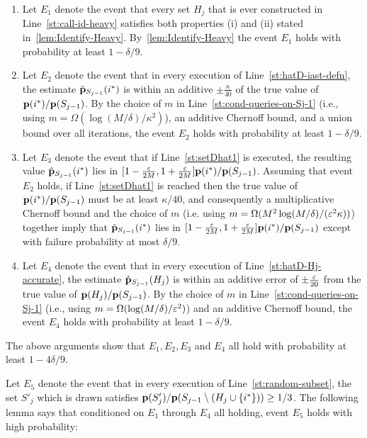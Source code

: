 \begin{enumerate}

\item Let $E_1$ denote the event that every set $H_{j}$ that is
ever constructed in Line~\ref{st:call-id-heavy}
satisfies both properties (i) and (ii)
stated in~\cref{lem:Identify-Heavy}.  By~\cref{lem:Identify-Heavy}
the event $E_1$ holds with probability at least $1 - \delta/9$.

\item Let $E_2$ denote the event that in every execution of
Line~\ref{st:hatD-iast-defn}, the estimate $\hat{\mathbf{p}}_{S_{j-1}}(i^\ast)$
is within an additive $\pm {\frac \kappa {40}}$ of the true value of
$\mathbf{p}(i^\ast)/\mathbf{p}(S_{j-1})$.  By the choice of $m$ in
Line~\ref{st:cond-queries-on-Sj-1}
{(i.e., using $m =\Omega(\log(M/\delta)/\kappa^2)$)},
an additive Chernoff bound, {and a union bound over all iterations},
the event $E_2$ holds with probability at least $1 - \delta/9$.

\item Let $E_3$ denote the event that if Line~\ref{st:setDhat1} is executed,
the resulting value
$\hat{\mathbf{p}}_{S_{j-1}}(i^\ast)$ lies in \mbox{$[1 - {\frac{\varepsilon}{2M}},
1+{\frac{\varepsilon}{2M}}]\mathbf{p}(i^\ast)/\mathbf{p}(S_{j-1})$.} Assuming that event $E_2$ holds, if Line~\ref{st:setDhat1} is reached then
the true value of $\mathbf{p}(i^\ast)/\mathbf{p}(S_{j-1})$ must be at least $\kappa/40$,
and consequently
a multiplicative Chernoff bound and the choice of $m$
{(i.e. using $m = \Omega(M^2\log(M/\delta)/(\varepsilon^2\kappa))$)}
together imply that
$\hat{\mathbf{p}}_{S_{j-1}}(i^\ast)$ lies in $[1 - {\frac{\varepsilon}{2M}},
1+{\frac{\varepsilon}{2M}}]\mathbf{p}(i^\ast)/\mathbf{p}(S_{j-1})$
except with failure probability at most $\delta/9$.

\item Let $E_4$ denote the event that
in every execution of
Line~\ref{st:hatD-Hj-accurate}, the estimate $\hat{\mathbf{p}}_{S_{j-1}}(H_{j})$
is within an additive error of $\pm {\frac{\ensuremath{\varepsilon}}{20} }$ from the true value of
$\mathbf{p}(H_{j})/\mathbf{p}(S_{j-1})$.  By the choice of $m$ in
Line~\ref{st:cond-queries-on-Sj-1}
{(i.e., using  $m = \Omega(\log(M/\delta)/\varepsilon^2)$)}
and an additive Chernoff bound,
the event $E_4$ holds with probability at least $1 - \delta/9$.

\end{enumerate}

The above arguments show that $E_1,E_2,E_3$ and $E_4$ all hold with probability
at least $1 - 4\delta/9$.

Let $E_5$ denote the event that in every execution of
Line~\ref{st:random-subset}, the set $S'_j$ which is drawn satisfies
\mbox{$\mathbf{p}(S'_j)/\mathbf{p}(S_{j-1} \setminus (H_{j} \cup \{i^\ast\})) \geq 1/3$}.
The following lemma says that conditioned
on $E_1$ through $E_4$  all holding, event $E_5$
holds with high probability:

